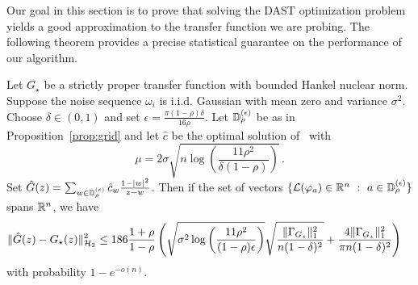 Our goal in this section is to prove that solving the DAST optimization problem yields a good approximation to the transfer function we are probing. The following theorem provides a precise statistical guarantee on the performance of our algorithm.
\begin{theorem}\label{thm:estimation}  Let $G_\star$ be a strictly proper transfer function with bounded Hankel nuclear norm. Suppose the noise sequence $\omega_i$ is i.i.d. Gaussian with mean zero and variance $\sigma^2$.  Choose $\delta \in (0,1)$ and set $\epsilon = \frac{\pi (1-\rho)\delta}{16 \rho}$.  Let $\mathbb{D}_\rho^{(\epsilon)}$ be as in Proposition~\ref{prop:grid} and let $\hat{c}$ be the optimal solution of~ with 
\[
\mu=2\sigma \sqrt{ n \log \left(\frac{11 \rho^2}{\delta(1-\rho)} \right)}\,.
\]
Set $\hat{G}(z) = \sum_{w \in \mathbb{D}_{\rho}^{(\epsilon)}} \hat{c}_w \frac{1-|w|^2}{z-w}$.  Then if the set of vectors $\{\mathcal{L}(\varphi_a)\in \mathbb{R}^n~:~a\in\mathbb{D}_{\rho}^{(\epsilon)}\}$ spans $\mathbb{R}^n$, we have 
\[
\begin{aligned}
	&\|\hat{G}(z)-G_{\star}(z)\|_{\mathcal{H}_2}^2 \leq  
	186 \frac{1+\rho}{1-\rho} \left( \sqrt{\sigma^2 \log\left(\frac{11 \rho^2}{(1-\rho)\epsilon}\right)}\sqrt{\frac{\|\Gamma_{G_\star}\|_{1}^2}{n(1-\delta)^2} } + \frac{4\|\Gamma_{G_\star}\|_{1}^2}{\pi n(1-\delta)^2}   \right)
	\end{aligned}
\]
with probability $1-e^{-o(n)}$.
\end{theorem}

